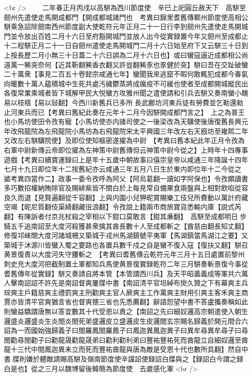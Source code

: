 <br />
　　二年春正月丙戌以高駢為西川節度使　辛巳上祀圓丘赦天下　高駢至劒州先遣使走馬開成都門【開成都城諸門也　考異曰錦里耆舊傳鄆州節度使高相公駢乘急詔除劒南西州節度副大使乾符元年正月二十一日行李到劒州先遣使走馬開城門並令放出百姓二月十六日至府豁開城門並放人出今從實録置今年又劒州至成都止十二程駢正月二十一日自劒州遣使走馬開城門二月十六日始至府下又云駢三十日到上按長歷二月小無三十日蓋二十六日誤為二月十六日也】或曰蠻寇逼近成都相公尚遠萬一豨突奈何【近其靳翻豨香衣翻又許豈翻豨豕也豕健於突】駢曰吾在交趾破蠻二十萬衆【事見二百五十卷懿宗咸通七年】蠻聞我來逃竄不暇何敢輒犯成都今春氣向暖數十萬人藴積城中生死共處汚穢鬱蒸將成癘疫不可緩也使者至成都開城縱民出各復常業乘城者皆下城解甲民大悦蠻方攻雅州聞之遣使請和引兵去駢又奏南蠻小醜易以枝梧【易以䜴翻】今西川新舊兵已多所長武鄜坊河東兵徒有勞費並乞勒還勑止河東兵而已【考異曰舊紀此奏在元年十二月今因駢開成都門言之】　上之為普王也小馬坊使田令孜有寵【小馬坊使亦内諸司使之一後梁改為天驥使後唐復舊長興元年改飛龍院為左飛龍院小馬坊為右飛龍院宋太平興國三年改左右天廐坊至雍熙二年又改左右騏驥院使】及即位使知樞密遂擢為中尉　【考異曰舊本紀此年正月令孜為右軍中尉新傳云帝即位擢為左神策中尉舊傳但云神策中尉今從之】上時年十四專事遊戲【考異曰續寶運録曰上是年十五歲中朝故事曰僖宗皇帝以咸通三年降誕十四年七月十九日即位年十二按舊紀亦云咸通三年五月八日生於東内即位年十二今從之　㨿考異四當作二】政事一委令孜呼為阿父【阿烏葛翻一讀如字阿保也】令孜頗讀書多巧數招權納賄除官及賜緋紫皆不關白於上每見常自備果食兩盤與上相對飲啗從容良久而退【見賢遍翻從千容翻】上與内園小兒狎昵賞賜樂工伎兒所費動以萬計府藏空竭【昵尼質翻伎渠綺翻藏徂浪翻】令孜說上籍兩市商旅寶貨悉輸内庫【說式芮翻】有陳訴者付京兆杖殺之宰相以下鉗口莫敢言【鉗其亷翻】　高駢至成都明日步騎五千追南詔至大度河殺獲甚衆擒其酋長數十人至成都斬之【酋慈由翻長知丈翻】修復邛崍關大度河諸城柵又築城于戎州馬湖鎮號平夷軍【馬湖鎮當馬湖江之要】又築城于沐源川皆蠻入蜀之要路也各置兵數千戍之自是蠻不復入寇【復扶又翻】駢召黄景復責以大度河失守腰斬之　【考異曰耆舊傳云乾符元年三月十五日處置前黎州刺史充大度河把截制置土軍都知兵馬使黄景復實録乾符二年三月駢奏斬景復今事從耆舊傳年從實録】駢又奏請自將本管【本管謂西川兵】及天平昭義義成等軍共六萬人擊南詔詔不許先是南詔督爽屢牒中書【南詔清平官坦綽布爕久贊之下有幕爽主兵琮爽主戶籍慈爽主禮罰爽主刑勸爽主官人厥爽主工作萬爽主財用引爽主客禾爽主商賈亦皆清平官爽猶言省也督爽摠三省也先悉薦翻】辭語怨望中書不答盧攜奏稱如此則蠻益驕謂唐無以答宜數其十代受恩以責之【南詔之先曰細奴邏高宗朝遣使入朝生邏盛炎邏盛炎生炎閤炎閤死弟盛邏皮立盛邏皮生皮邏閤玄宗賜名歸義於開元間合六詔為一而國始強歸義子曰閤羅鳳閤羅鳳子曰鳳迦異鳳迦異子曰異牟尋異牟尋子曰尋閤勸尋閤勸子曰勸龍晟勸龍晟弟曰勸利勸利弟曰豐祐豐祐死而酋龍立自細奴邏至酋龍十三代中間鳳迦異未立而死而豐祐酋龍與唐為敵是受恩十代也數所具翻】然自中書牒則嫌於體敵請賜高駢及嶺南節度使辛讜詔使録詔白牒與之【録詔白今謂之録白是也】從之三月以魏博留後韓簡為節度使　去歲感化軍<br />
